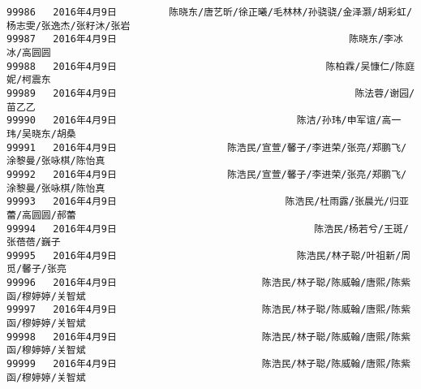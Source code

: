 \documentclass[11pt]{article}
\begin{document}
\begin{Verbatim}[commandchars=\\\{\}]
99986   2016年4月9日         陈晓东/唐艺昕/徐正曦/毛林林/孙骁骁/金泽灏/胡彩虹/杨志雯/张逸杰/张籽沐/张岩   
99987   2016年4月9日                                        陈晓东/李冰冰/高圆圆   
99988   2016年4月9日                                    陈柏霖/吴慷仁/陈庭妮/柯震东   
99989   2016年4月9日                                         陈法蓉/谢园/苗乙乙   
99990   2016年4月9日                               陈洁/孙玮/申军谊/高一玮/吴晓东/胡桑   
99991   2016年4月9日                   陈浩民/宣萱/馨子/李进荣/张亮/郑鹏飞/涂黎曼/张咏棋/陈怡真   
99992   2016年4月9日                   陈浩民/宣萱/馨子/李进荣/张亮/郑鹏飞/涂黎曼/张咏棋/陈怡真   
99993   2016年4月9日                             陈浩民/杜雨露/张晨光/归亚蕾/高圆圆/郝蕾   
99994   2016年4月9日                                  陈浩民/杨若兮/王斑/张蓓蓓/巍子   
99995   2016年4月9日                               陈浩民/林子聪/叶祖新/周觅/馨子/张亮   
99996   2016年4月9日                         陈浩民/林子聪/陈威翰/唐熙/陈紫函/穆婷婷/关智斌   
99997   2016年4月9日                         陈浩民/林子聪/陈威翰/唐熙/陈紫函/穆婷婷/关智斌   
99998   2016年4月9日                         陈浩民/林子聪/陈威翰/唐熙/陈紫函/穆婷婷/关智斌   
99999   2016年4月9日                         陈浩民/林子聪/陈威翰/唐熙/陈紫函/穆婷婷/关智斌   


\end{Verbatim}
\end{document}
